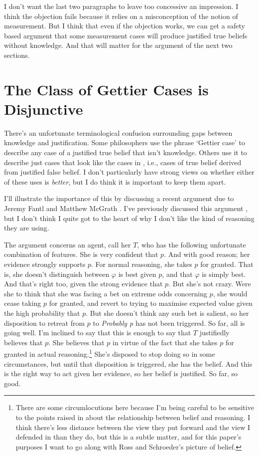 {I don't want the last two paragraphs to leave too concessive an impression. I think the objection fails because it relies on a misconception of the notion of measurement. But I think that even if the objection works, we can get a safety based argument that some measurement cases will produce justified true beliefs without knowledge. And that will matter for the argument of the next two sections.}

\section{The Class of Gettier Cases is Disjunctive}

There's an unfortunate terminological confusion surrounding gaps between kno\-wledge and justification. Some philosophers use the phrase `Gettier case' to describe any case of a justified true belief that isn't knowledge. Others use it to describe just cases that look like the cases in \cite{Gettier1963}, i.e., cases of true belief derived from justified false belief. I don't particularly have strong views on whether either of these uses is \textit{better}, but I do think it is important to keep them apart.

I'll illustrate the importance of this by discussing a recent argument due to Jeremy Fantl and Matthew McGrath \citep[Ch. 4]{FantlMcGrath2009}. I've previously discussed this argument \citep{Weatherson2011-WEAKBI}, but I don't think I quite got to the heart of why I don't like the kind of reasoning they are using.

The argument concerns an agent, call her $T$, who has the following unfortunate combination of features. She is very confident that $p$. And with good reason; her evidence strongly supports $p$. For normal reasoning, she takes $p$ for granted. That is, she doesn't distinguish between $\varphi$ is best given $p$, and that $\varphi$ is simply best. And that's right too, given the strong evidence that $p$. But she's not crazy. Were she to think that she was facing a bet on extreme odds concerning $p$, she would cease taking $p$ for granted, and revert to trying to maximise expected value given the high probability that $p$. But she doesn't think any such bet is salient, so her disposition to retreat from $p$ to \textit{Probably p} has not been triggered. So far, all is going well. I'm inclined to say that this is enough to say that $T$ justifiedly believes that $p$. She believes that $p$ in virtue of the fact that she takes $p$ for granted in actual reasoning.\footnote{There are some circumlocutions here because I'm being careful to be sensitive to the points raised in \cite{SchroederRoss2012} about the relationship between belief and reasoning. I think there's less distance between the view they put forward and the view I defended in \cite{Weatherson2005-WEACWD} than they do, but this is a subtle matter, and for this paper's purposes I want to go along with Ross and Schroeder's picture of belief.} She's disposed to stop doing so in some circumstances, but until that disposition is triggered, she has the belief. And this is the right way to act given her evidence, so her belief is justified. So far, so good.

